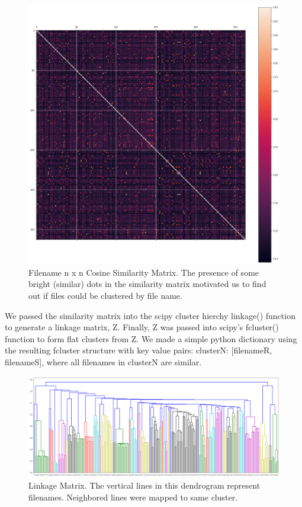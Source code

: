 \documentclass[sigconf,authordraft]{acmart}
\begin{document}
\begin{figure}[h]
  \centering
  \includegraphics[width=\linewidth]{similarity.png}
  \caption{Filename n x n Cosine Similarity Matrix. The presence of some bright (similar)
dots in the similarity matrix motivated us
to find out if files could be clustered by file
name.}
\end{figure}


We passed the similarity matrix into the scipy cluster hierchy linkage() function to generate a linkage matrix, Z. Finally, Z was passed into scipy’s fcluster() function to form flat clusters from Z. We made a simple python dictionary using the resulting fcluster structure with key value pairs: clusterN: [filenameR, filenameS], where all filenames in clusterN are similar. 

\begin{figure}[h]
  \centering
  \includegraphics[width=\linewidth]{dendrogram.png}
  \caption{Linkage Matrix. The vertical lines in this dendrogram represent filenames. Neighbored lines were mapped to same cluster.}
\end{figure}
\end{document}
